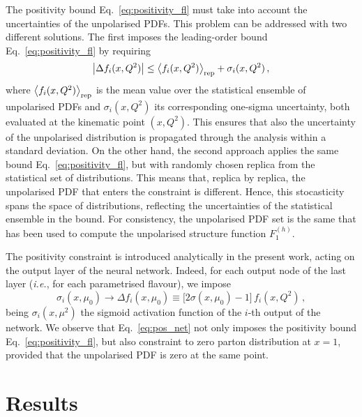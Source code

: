 The positivity bound Eq.~\eqref{eq:positivity_fl} must take into account the uncertainties of the unpolarised PDFs. This problem can be addressed with two different solutions. The first imposes the leading-order bound Eq.~\eqref{eq:positivity_fl} by requiring
\begin{equation}
  \left| \Delta f_i (x,Q^2) \right| \leq \left<f_i (x,Q^2)\right>_{\textrm{rep}} + \sigma_i(x,Q^2) \,,
  \label{eq:positivity_fl_sigma}
\end{equation}
where $\left<f_i (x,Q^2)\right>_{\textrm{rep}}$ is the mean value over the statistical ensemble of unpolarised PDFs and $\sigma_i(x,Q^2)$ its corresponding one-sigma uncertainty, both evaluated at the kinematic point $(x,Q^2)$. This ensures that also the uncertainty of the unpolarised distribution is propagated through the analysis within a standard deviation. On the other hand, the second approach applies the same bound Eq.~\eqref{eq:positivity_fl}, but with randomly chosen replica from the statistical set of distributions. This means that, replica by replica, the unpolarised PDF that enters the constraint is different. Hence, this stocasticity spans the space of distributions, reflecting the uncertainties of the statistical ensemble in the bound. For consistency, the unpolarised PDF set is the same that has been used to compute the unpolarised structure function $F_1^{(h)}$. %

The positivity constraint is introduced analytically in the present work, acting on the output layer of the neural network. Indeed, for each output node of the last layer (\textit{i.e.}, for each parametrised flavour), we impose
\begin{equation}
  \sigma_{i} (x,\mu_0) \rightarrow \Delta f_{i} (x, \mu_0) \equiv \bigl[ 2 \sigma(x,\mu_0) - 1 \bigr] \, f_{i} (x,Q^2) \,,
  \label{eq:pos_net}
\end{equation}
being $\sigma_i(x,\mu^2)$ the sigmoid activation function of the $i$-th output of the network. We observe that Eq.~\eqref{eq:pos_net} not only imposes the positivity bound Eq.~\eqref{eq:positivity_fl}, but also constraint to zero parton distribution at $x=1$, provided that the unpolarised PDF is zero at the same point. 

\section{Results}
\label{sec:4.4}

